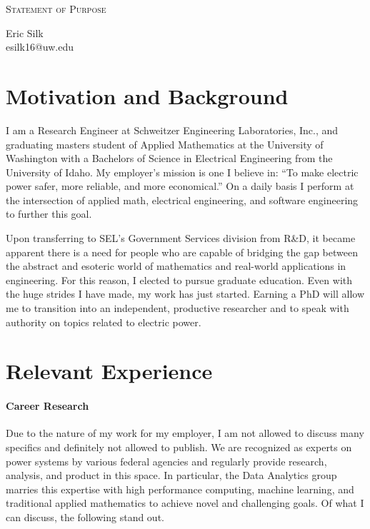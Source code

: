 \documentclass[letterpaper]{article}
\makeatletter
\newcommand{\soptitle}{Statement of Purpose}
\newcommand{\yourname}{Eric Silk}
\newcommand{\youremail}{esilk16@uw.edu}
\makeatother
\begin{document}
\begin{center}{\huge \scshape \soptitle}\end{center}
\begin{center}\vspace{0.2em} {\Large \yourname\\}
  {\youremail}\end{center}
\frenchspacing



\section*{Motivation and Background}
I am a Research Engineer at Schweitzer Engineering Laboratories, Inc., and graduating masters
student of Applied Mathematics at the University of Washington with a Bachelors of Science
in Electrical Engineering from the University of Idaho. My employer's mission is
one I believe in: ``To make electric power safer, more reliable, and more economical.'' On a daily
basis I perform at the intersection of applied math, electrical engineering, and software
engineering to further this goal.

Upon transferring to SEL's Government Services division from R\&D, it became apparent
there is a need for people who are capable of bridging the gap between the abstract
and esoteric world of mathematics and real-world applications in engineering.
For this reason, I elected to pursue graduate education.
Even with the huge strides I have made, my work has just started. Earning a PhD will allow me to
transition into an independent, productive researcher and to speak with authority on topics
related to electric power.

\section*{Relevant Experience}
\paragraph{Career Research}
Due to the nature of my work for my employer, I am not allowed to discuss many specifics
and definitely not allowed to publish. We are recognized as experts
on power systems by various federal agencies and regularly provide research, analysis,
and product in this space. In particular, the Data Analytics group marries this expertise
with high performance computing, machine learning, and traditional applied mathematics to
achieve novel and challenging goals. Of what I can discuss, the following stand out.
\end{document}
